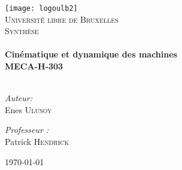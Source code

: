
\begin{titlepage}
\begin{center}

\texttt{[image: logoulb2]}~\\[1cm]

\textsc{\LARGE Université libre de Bruxelles}\\[1.5cm]

\textsc{\Large Synthèse}\\[0.4cm]

 
\HRule \\[0.4cm]
\LARGE
\textbf{\bfseries Cinématique et dynamique des machines}\\[0.4cm]
\textbf{MECA-H-303} \\[0.14cm]

\HRule \\[1cm]
\begin{minipage}{0.6\textwidth}
	\begin{flushleft} \large
		\emph{Auteur:}\\
		Enes \textsc{Ulusoy}\\
	\end{flushleft}
\end{minipage}
\begin{minipage}{0.25\textwidth}
	\large
		\emph{Professeur :}\\
		Patrick \textsc{Hendrick}
\end{minipage}
\vfill

{\large \today}
\end{center}
\end{titlepage}
